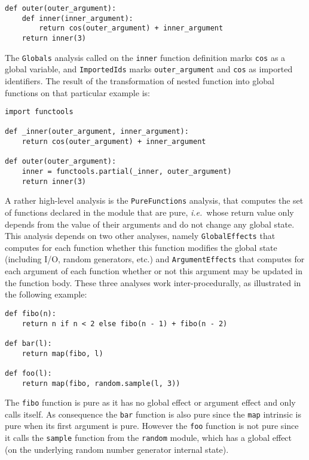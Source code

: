 \documentclass[10pt, onecolumn, preprint]{sigplanconf}
\providecommand{\ie}[1][~]{\textit{i.e.}#1}
\begin{document}
\begin{lstlisting}
def outer(outer_argument):
    def inner(inner_argument):
        return cos(outer_argument) + inner_argument
    return inner(3)
\end{lstlisting}

The \texttt{Globals} analysis called on the \texttt{inner} function definition
marks \texttt{cos} as a global variable, and \texttt{ImportedIds} marks
\texttt{outer\_argument} and \texttt{cos} as imported identifiers. The result
of the transformation of nested function into global functions on that
particular example is:

\begin{lstlisting}
import functools

def _inner(outer_argument, inner_argument):
    return cos(outer_argument) + inner_argument

def outer(outer_argument):
    inner = functools.partial(_inner, outer_argument)
    return inner(3)
\end{lstlisting}

A rather high-level analysis is the \texttt{PureFunctions} analysis, that computes the
set of functions declared in the module that are pure, \ie{whose return value
only depends from the value of their arguments and do not change any global state}.
This analysis depends on two
other analyses, namely \texttt{GlobalEffects} that computes for each function whether
this function modifies the global state (including I/O, random generators, etc.)
and \texttt{ArgumentEffects} that computes for each argument of each function 
whether or not this argument may be updated in the function body. These three
analyses work inter-procedurally, as illustrated in the following example:

\begin{lstlisting}
def fibo(n):
    return n if n < 2 else fibo(n - 1) + fibo(n - 2)

def bar(l):
    return map(fibo, l)

def foo(l):
    return map(fibo, random.sample(l, 3))
\end{lstlisting}

The \texttt{fibo} function is pure as it has no global effect or argument effect and
only calls itself. As consequence the \texttt{bar} function is also pure since the
\texttt{map} intrinsic is pure when its first argument is pure. However the \texttt{foo}
function is not pure since it calls the \texttt{sample} function from the \texttt{random}
module, which has a global effect (on the underlying random number generator
internal state).
\end{document}

